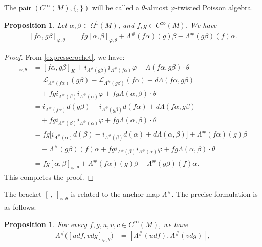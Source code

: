 \documentclass[a4paper,10pt]{article}
\numberwithin{equation}{section}
\theoremstyle{plain}
\newtheorem{proposition}[theorem]{Proposition}
\begin{document}
The pair $(C^\infty(M), \{ , \} )$ will be called a $\theta$-almost $\varphi$-twisted Poisson algebra.
		\begin{proposition}\label{inc4}
			Let  $\alpha, \beta\in\Omega^1(M)$, and $f,g \in C^\infty(M)$. We have
			\begin{align}\label{inc1}
				[f\alpha,g\beta]_{\varphi,\theta}&=fg[\alpha,\beta]_{\varphi,\theta}+\Lambda^{\#}(f\alpha)(g)\beta-\Lambda^{\#}(g\beta)(f)\alpha.
			\end{align}
		\end{proposition}
		\begin{proof}
			From \eqref{expresscrochet}, we have:  \begin{align*}
				[f\alpha,g\beta]_{\varphi,\theta}&=[f\alpha,g\beta]_K +
				i_{\Lambda^{\#}(g\beta)}i_{\Lambda^{\#}(f\alpha)}\varphi +
				\Lambda(f\alpha,g\beta)\cdot
				\theta\\
				&=\mathcal{L}_{\Lambda^{\#}(f\alpha)}(g\beta)-\mathcal{L}_{\Lambda^{\#}(g\beta)}(f\alpha)-d\Lambda(f\alpha,g\beta)\\
				&\quad+fgi_{\Lambda^{\#}(\beta)}i_{\Lambda^{\#}(\alpha)}\varphi +
				fg\Lambda(\alpha,\beta)\cdot
				\theta\\
				&=i_{\Lambda^{\#}(f\alpha)}d(g\beta)-i_{\Lambda^{\#}(g\beta)}d(f\alpha)+d\Lambda(f\alpha,g\beta)\\
				&\quad+fgi_{\Lambda^{\#}(\beta)}i_{\Lambda^{\#}(\alpha)}\varphi +
				fg\Lambda(\alpha,\beta)\cdot \theta\\
				 &=fg\big[i_{\Lambda^{\#}(\alpha)}d(\beta)-i_{\Lambda^{\#}(\beta)}d(\alpha)+d\Lambda(\alpha,\beta)\big]+\Lambda^{\#}(f\alpha)(g)\beta\\
				&\quad-\Lambda^{\#}(g\beta)(f)\alpha+
				fgi_{\Lambda^{\#}(\beta)}i_{\Lambda^{\#}(\alpha)}\varphi +
				fg\Lambda(\alpha,\beta)\cdot \theta\\
				&=fg[\alpha,\beta]_{\varphi,\theta}+\Lambda^{\#}(f\alpha)(g)\beta-\Lambda^{\#}(g\beta)(f)\alpha.
			\end{align*}
		This completes the proof.
		\end{proof}
		The bracket $[\ ,\ ]_{\varphi,\theta}$ is related to the anchor map $\Lambda^{\#}$. The precise formulation is as follows:
		\begin{proposition}\label{inc2}
		For every $f,g,u ,v,c\in C^\infty(M)$, we have
			\begin{align*}
				\Lambda^{\#}\big([udf,vdg]_{\varphi,\theta}\big)&=[\Lambda^{\#}(udf),\Lambda^{\#}(vdg)],
			\end{align*}
		\end{proposition}
\end{document}
